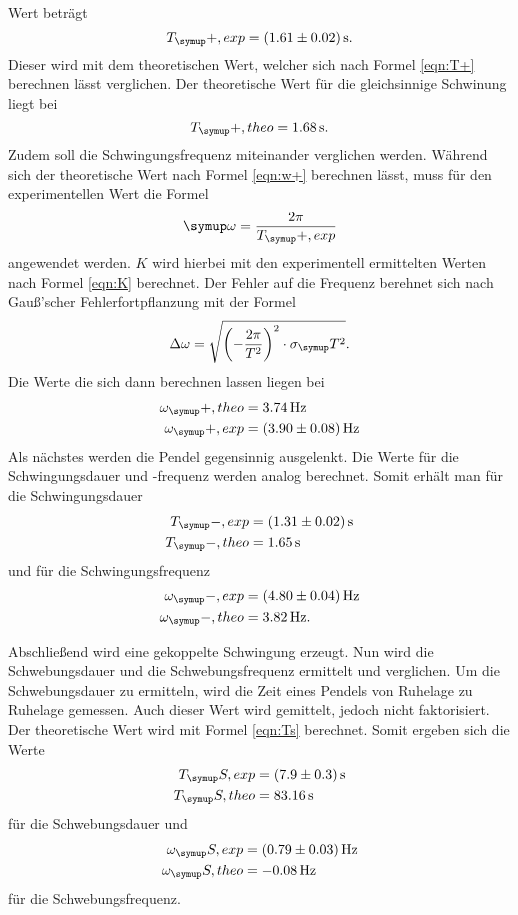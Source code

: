 Wert beträgt
\begin{equation*}
  T_\su{+, exp}=(1.61\pm0.02)\sek.
\end{equation*}
Dieser wird mit dem theoretischen Wert, welcher sich nach Formel \eqref{eqn:T+}
berechnen lässt verglichen. Der theoretische Wert für die gleichsinnige Schwinung
liegt bei
\begin{equation*}
  T_\su{+, theo}=1.68\sek.
\end{equation*}
Zudem soll die Schwingungsfrequenz miteinander verglichen werden. Während sich
der theoretische Wert nach Formel \eqref{eqn:w+}
berechnen lässt, muss für den experimentellen Wert die Formel
\begin{equation}
  \su{\omega}=\frac{2\pi}{T_\su{+, exp}}
  \label{eqn:wexp}
\end{equation}
angewendet werden. $K$ wird hierbei mit den experimentell ermittelten Werten nach
Formel \eqref{eqn:K} berechnet. Der Fehler auf die Frequenz berehnet sich nach
Gauß'scher Fehlerfortpflanzung mit der Formel
\begin{equation}
  \Delta\omega=\sqrt{\biggl(-\frac{2\pi}{T^2}\biggr)^2\cdot\sigma_\su{T}^2}.
\end{equation}
Die Werte die sich dann berechnen lassen liegen bei
\begin{align*}
  \omega_\su{+,theo} &= 3.74\Hz \\
  \omega_\su{+,exp}  &= (3.90 \pm 0.08)\Hz
\end{align*}
Als nächstes werden die Pendel gegensinnig ausgelenkt. Die Werte für die
Schwingungsdauer und -frequenz werden analog berechnet. Somit erhält man für die
Schwingungsdauer
\begin{align*}
  T_\su{-, exp} &= (1.31\pm0.02)\sek \\
  T_\su{-, theo} &= 1.65\sek
\end{align*}
und für die Schwingungsfrequenz
\begin{align*}
  \omega_\su{-, exp}  &= (4.80 \pm 0.04)\Hz \\
  \omega_\su{-, theo} &= 3.82\Hz.
\end{align*}

Abschließend wird eine gekoppelte Schwingung erzeugt. Nun wird die
Schwebungsdauer und die Schwebungsfrequenz ermittelt und verglichen. Um die
Schwebungsdauer zu ermitteln, wird die Zeit eines Pendels von Ruhelage zu
Ruhelage gemessen. Auch dieser Wert wird gemittelt, jedoch nicht faktorisiert.
Der theoretische Wert wird mit Formel \eqref{eqn:Ts} berechnet. Somit ergeben
sich die Werte
\begin{align*}
  T_\su{S, exp} &= (7.9\pm0.3)\sek \\
  T_\su{S,theo} &= 83.16\sek
\end{align*}
für die Schwebungsdauer und
\begin{align*}
  \omega_\su{S, exp} &= (0.79 \pm 0.03)\Hz \\
  \omega_\su{S, theo}&= -0.08\Hz
\end{align*}
für die Schwebungsfrequenz.
\newpage
